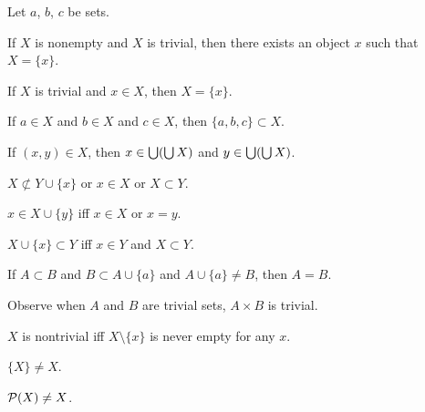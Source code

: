 \documentclass{article}
\begin{document}
Let $a$, $b$, $c$ be sets.
\begin{thm}
\item\label{zfmisc1:131} If $X$ is nonempty and $X$ is trivial, then
  there exists an object $x$ such that $X=\{x\}$.
\item\label{zfmisc1:132} If $X$ is trivial and $x\in X$, then $X=\{x\}$.
\item\label{zfmisc1:133} If $a\in X$ and $b\in X$ and $c\in X$, then
  $\{a,b,c\}\subset X$.
\item\label{zfmisc1:134} If $(x,y)\in X$, then $x\in\bigcup(\bigcup X)$
  and $y\in\bigcup(\bigcup X)$.
\item\label{zfmisc1:135} $X\nsubset Y\cup\{x\}$ or $x\in X$ or $X\subset Y$.
\item\label{zfmisc1:136} $x\in X\cup\{y\}$ iff $x\in X$ or $x=y$.
\item\label{zfmisc1:137} $X\cup\{x\}\subset Y$ iff $x\in Y$ and
  $X\subset Y$.
\item\label{zfmisc1:138} If $A\subset B$ and $B\subset A\cup\{a\}$ and
  $A\cup\{a\}\neq B$, then $A=B$.
\end{thm}

Observe when $A$ and $B$ are trivial sets, $A\times B$ is trivial.

\begin{thm}
\item\label{zfmisc1:139} $X$ is nontrivial iff $X\setminus\{x\}$ is
  never empty for any $x$.
\item\label{zfmisc1:140} $\{X\}\neq X$.
\item\label{zfmisc1:141} $\mathcal{P}(X)\neq X$.
\end{thm}
\end{document}
